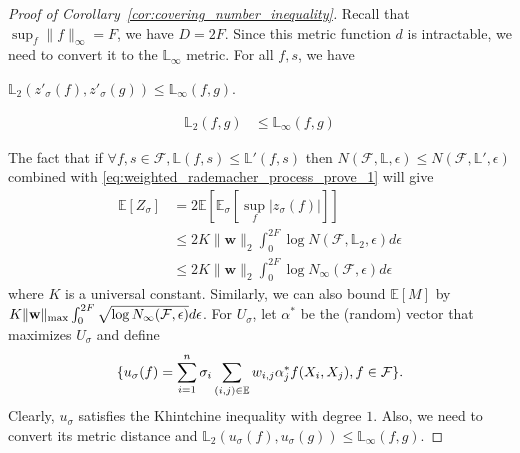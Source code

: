 \documentclass[letterpaper]{article} %
\def\DoubleColumn{}
\def\DoubleColumnEnd{}
\def\SingleColumn{}
\def\SingleColumnEnd{}
\newcommand{\E}{\mathbb{E}}
\newcommand{\weight}{\mathbf{w}}
\newcommand{\rademacher}{\sigma}
\newcommand{\pair}[1]{(#1)}
\newcommand{\lnorm}{\mathbb{L}}
\begin{document}
\begin{proof}[Proof of Corollary~\ref{cor:covering_number_inequality}]
Recall that $\sup_f \|f\|_\infty = F$, we have $D= 2F$.
Since this metric function $d$ is intractable, we need to convert it to the $\lnorm_\infty$ metric. For all $f,s$, we have
\DoubleColumn
$\lnorm{}_2(z'_\rademacher{}(f),z'_\rademacher{}(g))\le \lnorm_\infty(f,g)$.
\DoubleColumnEnd
\SingleColumn
\begin{align*}
    \lnorm{}_2(f,g)&\le \lnorm_\infty(f,g)
\end{align*}
\SingleColumnEnd
The fact that if $\forall f,s\in\mathcal F, \lnorm{}(f,s)\le \lnorm{}'(f,s)$ then $N(\mathcal F,\lnorm{},\epsilon)\le N(\mathcal F, \lnorm{}',\epsilon)$ combined with \eqref{eq:weighted_rademacher_process_prove_1} will give
\begin{align*}
    \E[Z_\rademacher]&= 2\E[\E_\rademacher[\sup_f|z_\rademacher(f)|]]\\
    &\le 2K\|\weight{}\|_2\int_0^{2F}\log N(\mathcal F,\lnorm{}_2,\epsilon)d\epsilon\\
    &\le 2K\|\weight{}\|_2\int_0^{2F}\log N_\infty(\mathcal F, \epsilon)d\epsilon
\end{align*}
where $K$ is a universal constant. Similarly, we can also bound $\E[M]$ by $K\|\weight{}\|_{\max}\linebreak\int_0^{2F}\sqrt{\log N_\infty(\mathcal F, \epsilon)}d\epsilon$. 
For $U_\rademacher$, let $\alpha^*$ be the (random) vector that maximizes $U_\rademacher$ and define
\[\{u_\rademacher(f) = \sum_{i=1}^n\rademacher_i\sum_{\pair{i,j}\in\E}w_{i,j}\alpha_j^*\linebreak f(X_i,X_j),f\in\mathcal{F}\}.\]
Clearly, $u_\rademacher$ satisfies the Khintchine inequality with degree $1$. Also, we need to convert its metric distance and $\lnorm{}_2(u_\rademacher{}(f), u_\rademacher{}(g))\le \lnorm{}_\infty(f, g)$.

\end{proof}
\end{document}
